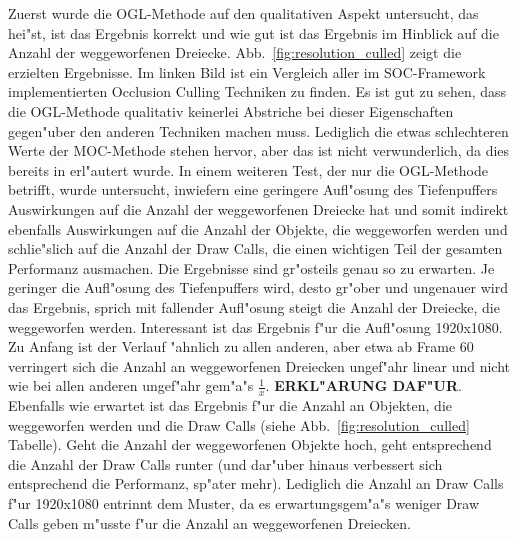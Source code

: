 \documentclass[journal]{vgtc}
\begin{document}
Zuerst wurde die OGL-Methode auf den qualitativen Aspekt untersucht, das hei"st, ist das Ergebnis korrekt und wie \glqq gut\grqq{} ist das Ergebnis im Hinblick auf die Anzahl der weggeworfenen Dreiecke.
Abb.\ \ref{fig:resolution_culled} zeigt die erzielten Ergebnisse.
Im linken Bild ist ein Vergleich aller im SOC-Framework implementierten Occlusion Culling Techniken zu finden.
Es ist gut zu sehen, dass die OGL-Methode qualitativ keinerlei Abstriche bei dieser Eigenschaften gegen"uber den anderen Techniken machen muss.
Lediglich die etwas schlechteren Werte der MOC-Methode stehen hervor, aber das ist nicht verwunderlich, da dies bereits in \cite{MSOC} erl"autert wurde.
In einem weiteren Test, der nur die OGL-Methode betrifft, wurde untersucht, inwiefern eine geringere Aufl"osung des Tiefenpuffers Auswirkungen auf die Anzahl der weggeworfenen Dreiecke hat und somit indirekt ebenfalls Auswirkungen auf die Anzahl der Objekte, die weggeworfen werden und schlie"slich auf die Anzahl der Draw Calls, die einen wichtigen Teil der gesamten Performanz ausmachen.
Die Ergebnisse sind gr"osteils genau so zu erwarten.
Je geringer die Aufl"osung des Tiefenpuffers wird, desto gr"ober und ungenauer wird das Ergebnis, sprich mit fallender Aufl"osung steigt die Anzahl der Dreiecke, die weggeworfen werden.
Interessant ist das Ergebnis f"ur die Aufl"osung 1920x1080.
Zu Anfang ist der Verlauf "ahnlich zu allen anderen, aber etwa ab Frame 60 verringert sich die Anzahl an weggeworfenen Dreiecken ungef"ahr linear und nicht wie bei allen anderen ungef"ahr gem"a"s $\frac{1}{x}$.
\textbf{ERKL"ARUNG DAF"UR}.
Ebenfalls wie erwartet ist das Ergebnis f"ur die Anzahl an Objekten, die weggeworfen werden und die Draw Calls (siehe Abb.\ \ref{fig:resolution_culled} Tabelle).
Geht die Anzahl der weggeworfenen Objekte hoch, geht entsprechend die Anzahl der Draw Calls runter (und dar"uber hinaus verbessert sich entsprechend die Performanz, sp"ater mehr).
Lediglich die Anzahl an Draw Calls f"ur 1920x1080 entrinnt dem Muster, da es erwartungsgem"a"s weniger Draw Calls geben m"usste f"ur die Anzahl an weggeworfenen Dreiecken.\\
\end{document}
